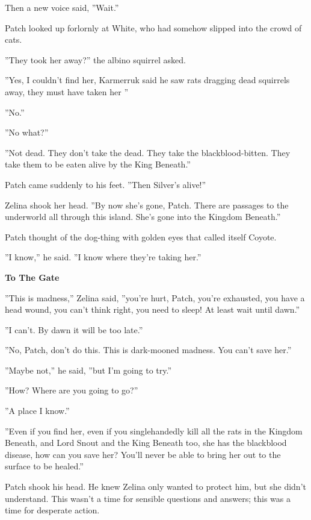 \documentclass[11pt]{article}
\begin{document}
 Then a new voice said, ''Wait.''\par
 Patch looked up forlornly at White, who had somehow slipped into the crowd of cats. \par
 ''They took her away?'' the albino squirrel asked.\par
 ''Yes, I couldn't find her, Karmerruk said he saw rats dragging dead squirrels away, they must have taken her %
''\par
 ''No.''\par
 ''No what?''\par
 ''Not dead. They don't take the dead. They take the blackblood-bitten. They take them to be eaten alive by the King Beneath.''\par
 Patch came suddenly to his feet. ''Then Silver's alive!''\par
 Zelina shook her head. ''By now she's gone, Patch. There are passages to the underworld all through this island. She's gone into the Kingdom Beneath.''\par
 Patch thought of the dog-thing with golden eyes that called itself Coyote.\par
 ''I know,'' he said. ''I know where they're taking her.''\par
\par
{\bf To The Gate\par
}\par
 ''This is madness,'' Zelina said, ''you're hurt, Patch, you're exhausted, you have a head wound, you can't think right, you need to sleep! At least wait until dawn.''\par
 ''I can't. By dawn it will be too late.''\par
 ''No, Patch, don't do this. This is dark-mooned madness. You can't save her.''\par
 ''Maybe not,'' he said, ''but I'm going to try.''\par
 ''How? Where are you going to go?''\par
 ''A place I know.''\par
 ''Even if you find her, even if you singlehandedly kill all the rats in the Kingdom Beneath, and Lord Snout and the King Beneath too, she has the blackblood disease, how can you save her? You'll never be able to bring her out to the surface to be healed.''\par
 Patch shook his head. He knew Zelina only wanted to protect him, but she didn't understand. This wasn't a time for sensible questions and answers; this was a time for desperate action.\par
\end{document}
